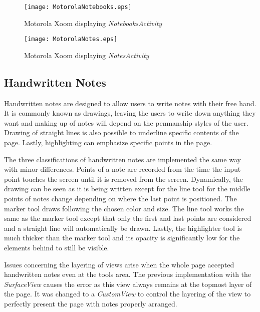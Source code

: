 \begin{figure}[htbp!]               
   \centering                
   \texttt{[image: MotorolaNotebooks.eps]}      
   \caption{Motorola Xoom displaying \textit{NotebooksActivity}}
   \label{fig:motorolanotebooksactivity}
\end{figure}

\begin{figure}[htbp!]           
   \centering                 
   \texttt{[image: MotorolaNotes.eps]}   
   \caption{Motorola Xoom displaying \textit{NotesActivity}}
   \label{fig:motorolanotesactivity}
\end{figure}

\pagebreak

\subsection{Handwritten Notes}
\label{sec:handwrittennotes}

Handwritten notes are designed to allow users to write notes with their free hand. It is commonly known as drawings, leaving the users to write down anything they want and making up of notes will depend on the penmanship styles of the user. Drawing of straight lines is also possible to underline specific contents of the page. Lastly, highlighting can emphasize specific points in the page.

The three classifications of handwritten notes are implemented the same way with minor differences. Points of a note are recorded from the time the input point touches the screen until it is removed from the screen. Dynamically, the drawing can be seen as it is being written except for the line tool for the middle points of notes change depending on where the last point is positioned. The marker tool draws following the chosen color and size. The line tool works the same as the marker tool except that only the first and last points are considered and a straight line will automatically be drawn. Lastly, the highlighter tool is much thicker than the marker tool and its opacity is significantly low for the elements behind to still be visible.

Issues concerning the layering of views arise when the whole page accepted handwritten notes even at the tools area. The previous implementation with the \textit{SurfaceView} causes the error as this view always remains at the topmost layer of the page. It was changed to a \textit{CustomView} to control the layering of the view to perfectly present the page with notes properly arranged.

